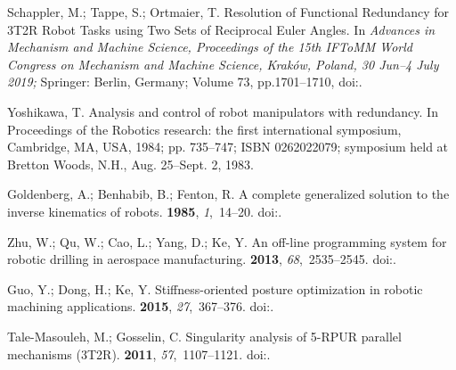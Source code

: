 \documentclass[robotics,article,accept,moreauthors,pdftex]{Definitions/mdpi}
\begin{document}
\begin{thebibliography}{999}
Schappler, M.; Tappe, S.; Ortmaier, T.
\newblock Resolution of Functional Redundancy for 3T2R Robot Tasks using Two
  Sets of Reciprocal Euler Angles.
\newblock  In \emph{Advances in Mechanism and Machine Science, Proceedings of  the 15th IFToMM World Congress on Mechanism and Machine Science, Kraków, Poland, 30 Jun--4 July 2019;} Springer: Berlin, Germany; Volume 73, pp.1701--1710,
\newblock 
  doi:{\href{https://doi.org/10.1007/978-3-030-20131-9_168}{}}.

Yoshikawa, T.
\newblock Analysis and control of robot manipulators with redundancy.
\newblock  In Proceedings of the Robotics research: the first international symposium, Cambridge, MA, USA, 1984; pp. 735--747; ISBN 0262022079; symposium held at Bretton Woods, N.H., Aug. 25--Sept. 2, 1983.

Goldenberg, A.; Benhabib, B.; Fenton, R.
\newblock A complete generalized solution to the inverse kinematics of robots.
 {\bf 1985}, {\em
  1},~14--20.
\newblock
  doi:{\href{https://doi.org/10.1109/JRA.1985.1086995}{}}.

Zhu, W.; Qu, W.; Cao, L.; Yang, D.; Ke, Y.
\newblock An off-line programming system for robotic drilling in aerospace
  manufacturing.
  {\bf 2013}, {\em 68},~2535--2545.
\newblock
  doi:{\href{https://doi.org/10.1007/s00170-013-4873-5}{}}.

Guo, Y.; Dong, H.; Ke, Y.
\newblock Stiffness-oriented posture optimization in robotic machining
  applications.
 {\bf
  2015}, {\em 27},~367--376.
\newblock
  doi:{\href{https://doi.org/10.1016/j.rcim.2015.02.006}{}}.

Tale-Masouleh, M.; Gosselin, C.
\newblock Singularity analysis of 5-RPUR parallel mechanisms (3T2R).
  {\bf 2011}, {\em 57},~1107--1121.
\newblock
  doi:{\href{https://doi.org/10.1007/s00170-011-3349-8}{}}.


\end{thebibliography}
\end{document}
